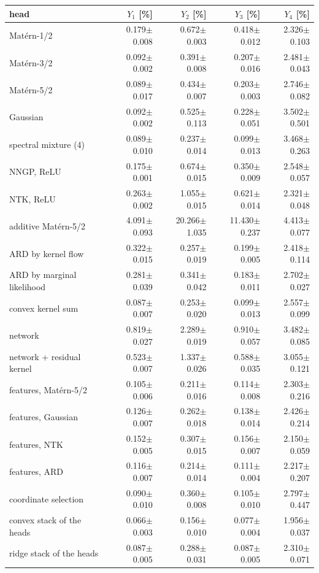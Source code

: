 {\fontsize{9}{11}\selectfont
\setlength{\tabcolsep}{3pt}
\begin{tabular}{lrrrr}
\toprule
head & $Y_1$ [\%] & $Y_2$ [\%] & $Y_3$ [\%] & $Y_4$ [\%] \\
\midrule
Mat\'ern-1/2 & 0.179$\pm$0.008 & 0.672$\pm$0.003 & 0.418$\pm$0.012 & 2.326$\pm$0.103 \\
Mat\'ern-3/2 & 0.092$\pm$0.002 & 0.391$\pm$0.008 & 0.207$\pm$0.016 & 2.481$\pm$0.043 \\
Mat\'ern-5/2 & 0.089$\pm$0.017 & 0.434$\pm$0.007 & 0.203$\pm$0.003 & 2.746$\pm$0.082 \\
Gaussian & 0.092$\pm$0.002 & 0.525$\pm$0.113 & 0.228$\pm$0.051 & 3.502$\pm$0.501 \\
spectral mixture (4) & 0.089$\pm$0.010 & 0.237$\pm$0.014 & 0.099$\pm$0.013 & 3.468$\pm$0.263 \\
NNGP, ReLU & 0.175$\pm$0.001 & 0.674$\pm$0.015 & 0.350$\pm$0.009 & 2.548$\pm$0.057 \\
NTK, ReLU & 0.263$\pm$0.002 & 1.055$\pm$0.015 & 0.621$\pm$0.014 & 2.321$\pm$0.048 \\
additive Mat\'ern-5/2 & 4.091$\pm$0.093 & 20.266$\pm$1.035 & 11.430$\pm$0.237 & 4.413$\pm$0.077 \\
ARD by kernel flow & 0.322$\pm$0.015 & 0.257$\pm$0.019 & 0.199$\pm$0.005 & 2.418$\pm$0.114 \\
ARD by marginal likelihood & 0.281$\pm$0.039 & 0.341$\pm$0.042 & 0.183$\pm$0.011 & 2.702$\pm$0.027 \\
convex kernel sum & 0.087$\pm$0.007 & 0.253$\pm$0.020 & 0.099$\pm$0.013 & 2.557$\pm$0.099 \\
network & 0.819$\pm$0.027 & 2.289$\pm$0.019 & 0.910$\pm$0.057 & 3.482$\pm$0.085 \\
network + residual kernel & 0.523$\pm$0.007 & 1.337$\pm$0.026 & 0.588$\pm$0.035 & 3.055$\pm$0.121 \\
features, Mat\'ern-5/2 & 0.105$\pm$0.006 & 0.211$\pm$0.016 & 0.114$\pm$0.008 & 2.303$\pm$0.216 \\
features, Gaussian & 0.126$\pm$0.007 & 0.262$\pm$0.018 & 0.138$\pm$0.014 & 2.426$\pm$0.214 \\
features, NTK & 0.152$\pm$0.005 & 0.307$\pm$0.015 & 0.156$\pm$0.007 & 2.150$\pm$0.059 \\
features, ARD & 0.116$\pm$0.007 & 0.214$\pm$0.014 & 0.111$\pm$0.004 & 2.217$\pm$0.207 \\
coordinate selection & 0.090$\pm$0.010 & 0.360$\pm$0.008 & 0.105$\pm$0.010 & 2.797$\pm$0.447 \\
convex stack of the heads & 0.066$\pm$0.003 & 0.156$\pm$0.010 & 0.077$\pm$0.004 & 1.956$\pm$0.037 \\
ridge stack of the heads & 0.087$\pm$0.005 & 0.288$\pm$0.031 & 0.087$\pm$0.005 & 2.310$\pm$0.071 \\
\bottomrule
\end{tabular}}
